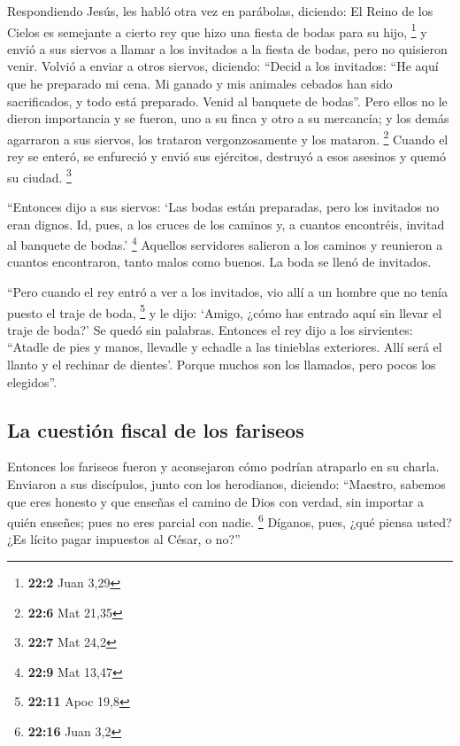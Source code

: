 \begin{paracol}{2}
 Respondiendo Jesús, les habló otra vez en parábolas,
diciendo:  El Reino de los Cielos es semejante a cierto
rey que hizo una fiesta de bodas para su hijo, \footnote{\textbf{22:2}
  Juan 3,29}  y envió a sus siervos a llamar a los
invitados a la fiesta de bodas, pero no quisieron venir. 
Volvió a enviar a otros siervos, diciendo: ``Decid a los invitados: ``He
aquí que he preparado mi cena. Mi ganado y mis animales cebados han sido
sacrificados, y todo está preparado. Venid al banquete de bodas''.
 Pero ellos no le dieron importancia y se fueron, uno a su
finca y otro a su mercancía;  y los demás agarraron a sus
siervos, los trataron vergonzosamente y los mataron. \footnote{\textbf{22:6}
  Mat 21,35}  Cuando el rey se enteró, se enfureció y
envió sus ejércitos, destruyó a esos asesinos y quemó su ciudad.
\footnote{\textbf{22:7} Mat 24,2}

 ``Entonces dijo a sus siervos: `Las bodas están
preparadas, pero los invitados no eran dignos.  Id, pues,
a los cruces de los caminos y, a cuantos encontréis, invitad al banquete
de bodas.' \footnote{\textbf{22:9} Mat 13,47}  Aquellos
servidores salieron a los caminos y reunieron a cuantos encontraron,
tanto malos como buenos. La boda se llenó de invitados.

 ``Pero cuando el rey entró a ver a los invitados, vio
allí a un hombre que no tenía puesto el traje de boda, \footnote{\textbf{22:11}
  Apoc 19,8}  y le dijo: `Amigo, ¿cómo has entrado aquí
sin llevar el traje de boda?' Se quedó sin palabras. 
Entonces el rey dijo a los sirvientes: ``Atadle de pies y manos,
llevadle y echadle a las tinieblas exteriores. Allí será el llanto y el
rechinar de dientes'.  Porque muchos son los llamados,
pero pocos los elegidos''.

\hypertarget{la-cuestiuxf3n-fiscal-de-los-fariseos}{%
\subsection{La cuestión fiscal de los
fariseos}\label{la-cuestiuxf3n-fiscal-de-los-fariseos}}

 Entonces los fariseos fueron y aconsejaron cómo podrían
atraparlo en su charla.  Enviaron a sus discípulos, junto
con los herodianos, diciendo: ``Maestro, sabemos que eres honesto y que
enseñas el camino de Dios con verdad, sin importar a quién enseñes; pues
no eres parcial con nadie. \footnote{\textbf{22:16} Juan 3,2}
 Díganos, pues, ¿qué piensa usted? ¿Es lícito pagar
impuestos al César, o no?''


\end{paracol}
